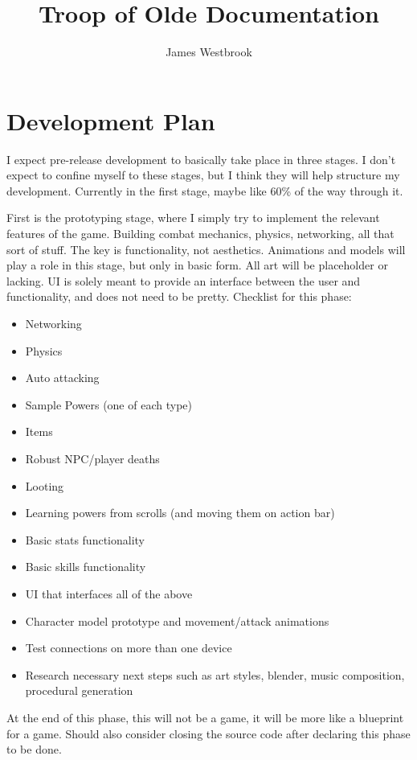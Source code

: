 \documentclass{article}
\title{Troop of Olde Documentation}
\author{James Westbrook}
\begin{document}
\maketitle

\tableofcontents

\pagebreak

\section{Development Plan}
I expect pre-release development to basically take place in three stages.
I don't expect to confine
myself to these stages, but I think they will help structure my development. Currently
in the first stage, maybe like 60\% of the way through it.

First is the prototyping stage, where I simply try to implement the relevant features
of the game. Building combat mechanics, physics, networking, all that sort of stuff.
The key is functionality, not aesthetics. Animations and models will play a role in this stage,
but only in basic form. All art will be placeholder or lacking. UI is solely meant to provide an
interface between the user and functionality, and does not need to be pretty.
Checklist for this phase:
\begin{itemize}
    \item Networking
    \item Physics
    \item Auto attacking
    \item Sample Powers (one of each type)
    \item Items
    \item Robust NPC/player deaths
    \item Looting
    \item Learning powers from scrolls (and moving them on action bar)
    \item Basic stats functionality
    \item Basic skills functionality
    \item UI that interfaces all of the above
    \item Character model prototype and movement/attack animations
    \item Test connections on more than one device
    \item Research necessary next steps such as art styles, blender,
    music composition, procedural generation
\end{itemize}
At the end of this phase, this will not be a game, it will be more like a blueprint for a game.
Should also consider closing the source code after declaring this phase to be done.
\end{document}
